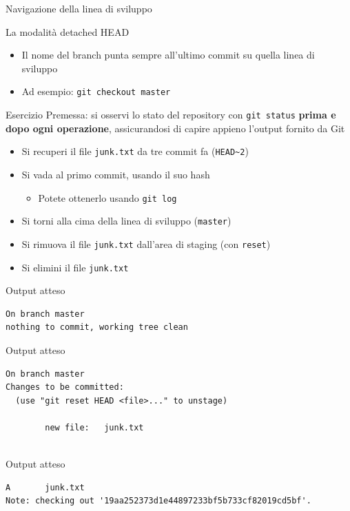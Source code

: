 \documentclass[presentation]{beamer}
\begin{document}
\begin{frame}{Navigazione della linea di sviluppo}
\begin{block}{La modalità detached HEAD}
\begin{itemize}
			\begin{itemize}
				\item Il nome del branch punta sempre all'ultimo commit su quella linea di sviluppo
				\item Ad esempio: \texttt{git checkout master}
			\end{itemize}
		\end{itemize}
	\end{block}
	\begin{block}{Esercizio}	
		Premessa: si osservi lo stato del repository con \texttt{git status} \textbf{prima e dopo ogni operazione}, assicurandosi di capire appieno l'output fornito da Git
		\begin{itemize}
			\item Si recuperi il file \texttt{junk.txt} da tre commit fa (\texttt{HEAD\textasciitilde{}2})
			\item Si vada al primo commit, usando il suo hash
			\begin{itemize}
				\item Potete ottenerlo usando \texttt{git log}
			\end{itemize}
			\item Si torni alla cima della linea di sviluppo (\texttt{master})
			\item Si rimuova il file \texttt{junk.txt} dall'area di staging (con \texttt{reset})
			\item Si elimini il file \texttt{junk.txt}
		\end{itemize}
	\end{block}
	\begin{block}{Output atteso}
		\begin{Verbatim}[fontsize=\scriptsize]
On branch master
nothing to commit, working tree clean
		\end{Verbatim}
	\end{block}
	\begin{block}{Output atteso}
		\begin{Verbatim}[fontsize=\scriptsize]
On branch master
Changes to be committed:
  (use "git reset HEAD <file>..." to unstage)

        new file:   junk.txt


		\end{Verbatim}
	\end{block}
	\begin{block}{Output atteso}
		\begin{Verbatim}[fontsize=\scriptsize]
A       junk.txt
Note: checking out '19aa252373d1e44897233bf5b733cf82019cd5bf'.


\end{Verbatim}
\end{block}
\end{frame}
\end{document}
